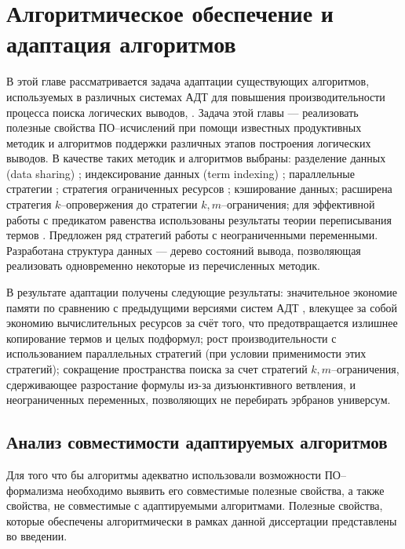 \chapter{Алгоритмическое обеспечение и адаптация алгоритмов}

В этой главе рассматривается задача адаптации существующих алгоритмов, используемых в различных системах АДТ для повышения производительности процесса поиска логических выводов, . Задача этой главы --- реализовать полезные свойства ПО--исчислений при помощи известных продуктивных методик и алгоритмов поддержки различных этапов построения логических выводов. В качестве таких методик и алгоритмов выбраны: разделение данных (data sharing) \cite{Che2, Ryazanov2003}; индексирование данных (term indexing) \cite{HARIndex, TermIndexingBook,pathindex}; параллельные стратегии \cite{PSETHEO}; стратегия ограниченных ресурсов \cite{Ryazanov2003}; кэширование данных; расширена стратегия $k$--опровержения \cite{ICDS2000, dissChe} до стратегии $k,m$--ограничения; для эффективной работы с предикатом равенства использованы результаты теории переписывания термов \cite{Nipkow}. Предложен ряд стратегий работы с неограниченными переменными. Разработана структура данных --- дерево состояний вывода, позволяющая реализовать одновременно некоторые из перечисленных методик.

В результате адаптации получены следующие результаты: значительное экономие памяти по сравнению с предыдущими версиями систем АДТ \cite{Cherkashin:diss:1999}, влекущее за собой экономию вычислительных ресурсов за счёт того, что предотвращается излишнее копирование термов и целых подформул; рост производительности с использованием параллельных стратегий (при условии применимости этих стратегий); сокращение пространства поиска за счет стратегий $k,m$--ограничения, сдерживающее разростание формулы из-за дизъюнктивного ветвления, и  неограниченных переменных, позволяющих не перебирать эрбранов универсум.

\section{Анализ совместимости адаптируемых алгоритмов}

Для того что бы алгоритмы адекватно использовали возможности ПО--формализма необходимо выявить его совместимые полезные свойства, а также свойства, не совместимые с адаптируемыми алгоритмами.  Полезные свойства, которые обеспечены алгоритмически в рамках данной диссертации представлены во введении.


